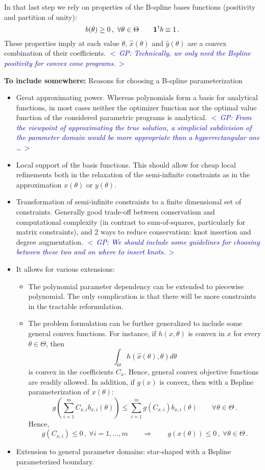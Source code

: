 \documentclass{article}
\renewcommand{\t}{^{\mbox{\tiny \sf T}}}    %
\newcommand{\ppar}{\theta}                  %
\newcommand{\Ppar}{\Theta}                  %
\newcommand{\commentGP}[1]{\noindent \textcolor{blue}{\emph{$<\,$GP: #1$\,>$}}}%
\begin{document}
In that last step we rely on properties of the B-spline bases functions (positivity and partition of unity):
\[ b(\ppar)\geq0\,,~\forall\ppar\in\Ppar \qquad \mathbf{1}\t b \equiv 1\,.%
\]
These properties imply at each value $\ppar$, $\hat{x}(\ppar)$ and $\hat{y}(\ppar)$ are a convex combination of their coefficients. \commentGP{Technically, we only need the Bspline positivity for convex cone programs.}

\vspace*{12pt}
\noindent\textbf{To include somewhere:} Reasons for choosing a B-spline parameterization
\begin{itemize}
\item Great approximating power. Whereas polynomials form a basis for analytical functions, in most cases neither the optimizer function nor the optimal value function of the considered parametric programs is analytical. \commentGP{From the viewpoint of approximating the true solution, a simplicial subdivision of the parameter domain would be more appropriate than a hyperrectangular one \ldots}
\item Local support of the basis functions. This should allow for cheap local refinements both in the relaxation of the semi-infinite constraints as in the approximation $x(\ppar)$ or $y(\ppar)$.   
\item Transformation of semi-infinite constraints to a finite dimensional set of constraints. Generally good trade-off between conservatism and computational complexity (in contrast to sum-of-squares, particularly for matrix constraints), and 2 ways to reduce conservatism: knot insertion and degree augmentation. \commentGP{We should include some guidelines for choosing between these two and on where to insert knots.}
\item It allows for various extensions:
    \begin{itemize}
    \item The polynomial parameter dependency can be extended to piecewise polynomial. The only complication is that there will be more constraints in the tractable reformulation.
    \item The problem formulation can be further generalized to include some general convex functions. For instance, if $h(x,\ppar)$ is convex in $x$ for every $\ppar\in\Ppar$, then
        \[ \int_{\Ppar} h(\hat{x}(\ppar), \ppar) d\ppar
        \]
        is convex in the coefficients $C_x$. Hence, general convex objective functions are readily allowed. In addition, if $g(x)$ is convex, then with a Bspline parameterization of $x(\ppar)$:
        \[ g\left(\sum_{i=1}^m C_{x,i} b_{x,i}(\ppar)\right) \leq \sum_{i=1}^m g(C_{x,i}) b_{x,i}(\ppar) \qquad \forall \ppar\in\Ppar\,. %
        \]
        Hence,
        \[ g(C_{x,i})\leq 0\,,~\forall i=1,\ldots,m \qquad \Rightarrow \qquad g(x(\ppar))\leq0\,,~\forall \ppar\in\Ppar\,.%
        \]
        \end{itemize}
    \item Extension to general parameter domains: star-shaped with a Bspline parameterized boundary.
\end{itemize}
\end{document}
